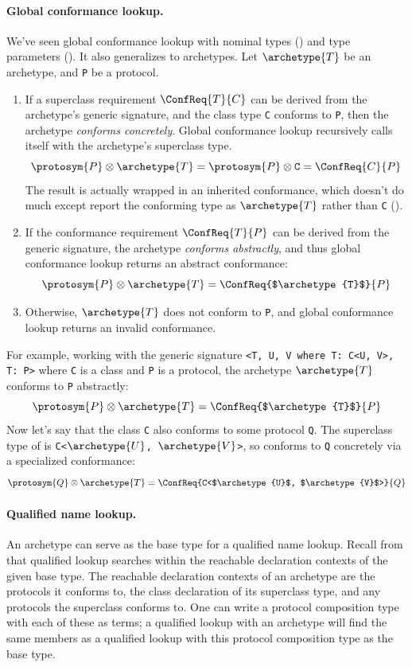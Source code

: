 \documentclass[../generics]{subfiles}
\begin{document}
\paragraph{Global conformance lookup.} We've seen global conformance lookup with nominal types () and type parameters (). It also generalizes to archetypes. Let $\archetype{T}$ be an archetype, and \texttt{P} be a protocol.
\begin{enumerate}
\item If a superclass requirement $\ConfReq{T}{C}$ can be derived from the archetype's generic signature, and the class type \texttt{C} conforms to \texttt{P}, then the archetype \emph{conforms concretely}. Global conformance lookup recursively calls itself with the archetype's superclass type.
\[\protosym{P}\otimes\archetype{T}=\protosym{P}\otimes\texttt{C}=\ConfReq{C}{P}\]
The result is actually wrapped in an inherited conformance, which doesn't do much except report the conforming type as $\archetype{T}$ rather than \texttt{C} ().
\item If the conformance requirement $\ConfReq{T}{P}$ can be derived from the generic signature, the archetype \emph{conforms abstractly}, and thus global conformance lookup returns an abstract conformance:
\[\protosym{P}\otimes\archetype{T}=\ConfReq{$\archetype{T}$}{P}\]
\item Otherwise, $\archetype{T}$ does not conform to \texttt{P}, and global conformance lookup returns an invalid conformance.
\end{enumerate}
For example, working with the generic signature \verb|<T, U, V where T: C<U, V>, T: P>| where \texttt{C} is a class and \texttt{P} is a protocol, the archetype $\archetype{T}$ conforms to \texttt{P} abstractly:
\[
\protosym{P}\otimes \archetype{T} = \ConfReq{$\archetype{T}$}{P}
\]
Now let's say that the class \texttt{C} also conforms to some protocol \texttt{Q}. The superclass type of  is \texttt{C<$\archetype{U}$, $\archetype{V}$>}, so  conforms to \texttt{Q} concretely via a specialized conformance:
\[
\protosym{Q}\otimes \archetype{T} = \ConfReq{C<$\archetype{U}$, $\archetype{V}$>}{Q}
\]

\paragraph{Qualified name lookup.} An archetype can serve as the base type for a qualified name lookup. Recall from  that qualified lookup searches within the reachable declaration contexts of the given base type. The reachable declaration contexts of an archetype are the protocols it conforms to, the class declaration of its superclass type, and any protocols the superclass conforms to. One can write a protocol composition type with each of these as terms; a qualified lookup with an archetype will find the same members as a qualified lookup with this protocol composition type as the base type.
\end{document}
